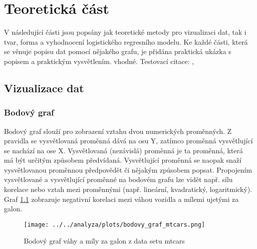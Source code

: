 \chapter{Teoretická část}
V následující části jsou popsány jak teoretické metody pro vizualizaci dat, tak i tvar, forma a vyhodnocení logistického regresního modelu. 
Ke každé části, která se věnuje popisu dat pomocí nějakého grafu, je přidána praktická ukázka s popisem a praktickým vysvětlením.
vhodné.
Testovací citace: \cite{Hebak2015}, \cite{Kleinbaum2010}

\section{Vizualizace dat}
\subsection{Bodový graf}
{\color{red}
Bodový graf slouží pro zobrazení vztahu dvou numerických proměnných. Z pravidla se vysvětlovaná proměnná dává na osu Y,
zatímco proměnná vysvětlující se nachází na ose X. Vysvětlovaná (nezávislá) proměnná je ta proměnná, která má být určitým způsobem předvídaná.
Vysvětlující proměnná se naopak snaží vysvětlovanou proměnnou předpovědět či nějakým způsobem popsat. Propojením vysvětlované a vysvětlující proměnné
na bodovém grafu lze vidět např. sílu korelace nebo vztah mezi proměnnými (např. lineární, kvadratický, logaritmický). Graf \ref{fig:bodovy_graf_mtcars} zobrazuje
negativní korelaci mezi váhou vozidla a mílemi ujetými za galon.
}

\begin{figure}[H]
    \centering
    \texttt{[image: ../../analyza/plots/bodovy\_graf\_mtcars.png]}
    \caption{Bodový graf váhy a míly za galon z data setu mtcars} 
    \label{fig:bodovy_graf_mtcars}
\end{figure}

